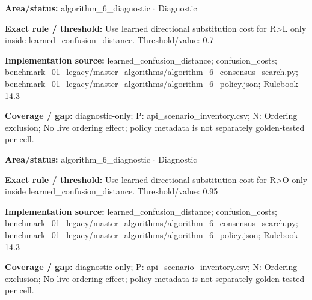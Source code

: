 \begin{tcolorbox}[enhanced,breakable,colback=white,colframe=Muted!45,boxrule=0.45pt,arc=1.5pt,left=6pt,right=6pt,top=5pt,bottom=5pt,title={\texttt{A6-LEARNED-SUBSTITUTION-R-L}},title after break={\texttt{A6-LEARNED-SUBSTITUTION-R-L}\ (continued)},fonttitle=\headingfont\bfseries\color{Navy},coltitle=Navy]
\textbf{Area/status:} algorithm\_\allowbreak{}6\_\allowbreak{}diagnostic $\boldsymbol{\cdot}$ Diagnostic\par
\smallskip
\textbf{Exact rule / threshold:} Use learned directional substitution cost for R>L only inside learned\_\allowbreak{}confusion\_\allowbreak{}distance. Threshold/\allowbreak{}value: 0.7\par
\smallskip
\textbf{Implementation source:} learned\_\allowbreak{}confusion\_\allowbreak{}distance; confusion\_\allowbreak{}costs; benchmark\_\allowbreak{}01\_\allowbreak{}legacy/\allowbreak{}master\_\allowbreak{}algorithms/\allowbreak{}algorithm\_\allowbreak{}6\_\allowbreak{}consensus\_\allowbreak{}search.py; benchmark\_\allowbreak{}01\_\allowbreak{}legacy/\allowbreak{}master\_\allowbreak{}algorithms/\allowbreak{}algorithm\_\allowbreak{}6\_\allowbreak{}policy.json; Rulebook 14.3\par
\smallskip
\textbf{Coverage / gap:} diagnostic-only; P: api\_\allowbreak{}scenario\_\allowbreak{}inventory.csv; N: Ordering exclusion; No live ordering effect; policy metadata is not separately golden-tested per cell.
\end{tcolorbox}
\begin{tcolorbox}[enhanced,breakable,colback=white,colframe=Muted!45,boxrule=0.45pt,arc=1.5pt,left=6pt,right=6pt,top=5pt,bottom=5pt,title={\texttt{A6-LEARNED-SUBSTITUTION-R-O}},title after break={\texttt{A6-LEARNED-SUBSTITUTION-R-O}\ (continued)},fonttitle=\headingfont\bfseries\color{Navy},coltitle=Navy]
\textbf{Area/status:} algorithm\_\allowbreak{}6\_\allowbreak{}diagnostic $\boldsymbol{\cdot}$ Diagnostic\par
\smallskip
\textbf{Exact rule / threshold:} Use learned directional substitution cost for R>O only inside learned\_\allowbreak{}confusion\_\allowbreak{}distance. Threshold/\allowbreak{}value: 0.95\par
\smallskip
\textbf{Implementation source:} learned\_\allowbreak{}confusion\_\allowbreak{}distance; confusion\_\allowbreak{}costs; benchmark\_\allowbreak{}01\_\allowbreak{}legacy/\allowbreak{}master\_\allowbreak{}algorithms/\allowbreak{}algorithm\_\allowbreak{}6\_\allowbreak{}consensus\_\allowbreak{}search.py; benchmark\_\allowbreak{}01\_\allowbreak{}legacy/\allowbreak{}master\_\allowbreak{}algorithms/\allowbreak{}algorithm\_\allowbreak{}6\_\allowbreak{}policy.json; Rulebook 14.3\par
\smallskip
\textbf{Coverage / gap:} diagnostic-only; P: api\_\allowbreak{}scenario\_\allowbreak{}inventory.csv; N: Ordering exclusion; No live ordering effect; policy metadata is not separately golden-tested per cell.
\end{tcolorbox}
